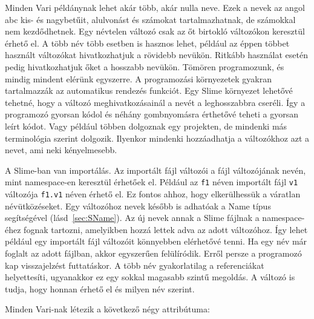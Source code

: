 Minden Vari példánynak lehet akár több, akár nulla neve.
Ezek a nevek az angol abc kis- és nagybetűit, alulvonást és számokat tartalmazhatnak, de számokkal nem kezdődhetnek.
Egy névtelen változó csak az őt birtokló változókon keresztül érhető el.
A több név több esetben is hasznos lehet, például az éppen többet használt változókat hivatkozhatjuk a rövidebb nevükön.
Ritkább használat esetén pedig hivatkozhatjuk őket a hosszabb nevükön.
Tömören programozunk, és mindig mindent elérünk egyszerre.
A programozási környezetek gyakran tartalmazzák az automatikus rendezés funkciót.
Egy Slime környezet lehetővé tehetné, hogy a változó meghivatkozásainál a nevét a leghosszabbra cseréli.
Így a programozó gyorsan kódol és néhány gombnyomásra érthetővé teheti a gyorsan leírt kódot.
Vagy például többen dolgoznak egy projekten, de mindenki más terminológia szerint dolgozik.
Ilyenkor mindenki hozzáadhatja a változókhoz azt a nevet, ami neki kényelmesebb.

A Slime-ban van importálás.
Az importált fájl változói a fájl változójának nevén, mint namespace-en keresztül érhetőek el.
Például az \texttt{f1} néven importált fájl \texttt{v1} változója \texttt{f1.v1} néven érhető el.
Ez fontos ahhoz, hogy elkerülhessük a váratlan névütközéseket.
Egy változóhoz nevek később is adhatóak a Name típus segítségével (lásd~\ref{sec:SName}).
Az új nevek annak a Slime fájlnak a namespace-éhez fognak tartozni, amelyikben hozzá lettek adva az adott változóhoz. 
Így lehet például egy importált fájl változóit könnyebben elérhetővé tenni.
Ha egy név már foglalt az adott fájlban, akkor egyszerűen felülíródik.
Erről persze a programozó kap visszajelzést futtatáskor.
A több név gyakorlatilag a referenciákat helyettesíti, ugyanakkor ez egy sokkal magasabb szintű megoldás.
A változó is tudja, hogy honnan érhető el és milyen név szerint.

Minden Vari-nak létezik a következő négy attribútuma:

